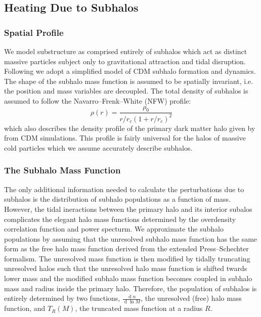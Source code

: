 \documentclass[usenatbib]{mnras}
\renewcommand{\d}[1]{\! \mathrm{d}#1 \:}
\renewcommand{\d}[1]{\ensuremath{\operatorname{d}\!{#1}}}
\begin{document}
\subsection{Heating Due to Subhalos}

\subsubsection{Spatial Profile}

	We model substructure as comprised entirely of subhalos which act as distinct massive particles subject only to gravitational attraction and tidal disruption. Following \citet{tidal_limit, unified_model} we adopt a
simplified model of CDM subhalo
formation and dynamics. The shape of
the subhalo mass function is assumed to
be spatially invariant, i.e. the position
and mass variables are decoupled. The
total density of subhalos is assumed to
follow the Navarro--Frenk--White (NFW) profile:
\begin{equation}
\rho(r) = \frac{\rho_0}{r/r_c (1+r/r_c)^2}
\end{equation} which also
describes the density profile of the
primary dark matter halo given by \citet{structure} from CDM simulations. This profile is fairly universal for the halos of massive cold particles which we assume accurately describe subhalos.

\subsubsection{The Subhalo Mass Function}

The only additional information needed to calculate the perturbations due to subhalos is the distribution of subhalo populations as a function of mass. However, the tidal ineractions between the primary halo and its interior subalos complicates the elegant halo mass functions determined by the overdensity correlation function and power specturm. We approximate the subhalo populations by assuming that the unresolved subhalo mass function has the same form as the free halo mass function derived from the extended Press--Schechter formalism. The unresolved mass function is then modified by tidally truncating unresolved halos such that the unresolved halo mass function is shifted twards lower mass and the modified subhalo mass function becomes coupled in subhalo mass and radius inside the primary halo. Therefore, the population of subhalos is entirely determined by two functions, $\frac{\d{n}}{\d{\ln{M}}}$, the unresolved (free) halo mass function, and $T_R(M)$, the truncated mass function at a radius $R$.
\end{document}
